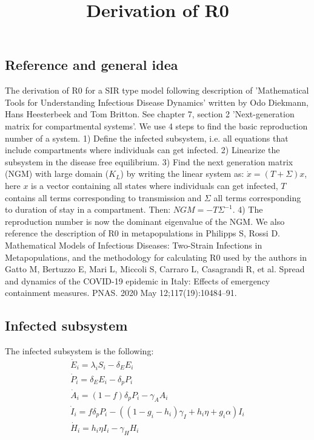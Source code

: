 \documentclass{article}
\title{Derivation of R0}
\begin{document}
\maketitle

\subsection*{Reference and general idea}

The derivation of R0 for a SIR type model following description of 'Mathematical Tools for Understanding Infectious Disease Dynamics' written by Odo Diekmann, Hans Heesterbeek and Tom Britton. 
See chapter 7, section 2 'Next-generation matrix for compartmental systems'. 
We use 4 steps to find the basic reproduction number of a system.
1) Define the infected subsystem, i.e. all equations that include compartments where individuals can get infected. 
2) Linearize the subsystem in the disease free equilibrium. 
3) Find the next generation matrix (NGM) with large domain ($K_L$) by writing the linear system as: $\dot{x} = (T + \Sigma) x$, here $x$ is a vector containing all states where individuals can get infected, $T$ contains all terms corresponding to transmission and $\Sigma$ all terms corresponding to duration of stay in a compartment. Then: $NGM = -T \Sigma^{-1}. $
4) The reproduction number is now the dominant eigenvalue of the NGM. 
We also reference the description of R0 in metapopulations in Philipps S, Rossi D. Mathematical Models of Infectious Diseases: Two-Strain Infections in Metapopulations, and the methodology for calculating R0 used by the authors in Gatto M, Bertuzzo E, Mari L, Miccoli S, Carraro L, Casagrandi R, et al. Spread and dynamics of the COVID-19 epidemic in Italy: Effects of emergency containment measures. PNAS. 2020 May 12;117(19):10484–91.


\subsection*{Infected subsystem}

The infected subsystem is the following: 
\\
\begin{gather*}
    \dot{E}_i =  \lambda_i S_i - \delta_E E_i \\
    \dot{P}_i = \delta_E E_i - \delta_p P_i \\
    \dot{A}_i = (1-f) \delta_p P_i - \gamma_A A_i \\
    \dot{I}_i = f \delta_p P_i - ((1-g_i-h_i) \gamma_{I} + h_i \eta + g_i \alpha) I_i \\   
    \dot{H}_i = h_i \eta I_i - \gamma_H H_i   
\end{gather*}
\\
\end{document}
